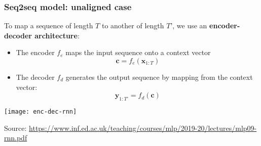 \documentclass[smaller]{beamer}
\begin{document}
\begin{frame}
  \frametitle{Seq2seq model: unaligned case}
  \pe
  \begin{minipage}{.5\linewidth}
  To map a sequence of length $T$ to another of length $T’$, we use an \textbf{encoder-decoder architecture}:\pe
  \begin{itemize}
  \item The encoder $f_e$ maps the input sequence onto a context vector
    \begin{equation}
      \bm c = f_e(\bm x_{1:T})
    \end{equation}
    \pe
  \item The decoder $f_d$ generates the output sequence by mapping from the context vector:\pe
    \begin{equation}
      \bm y_{1:T’} = f_d(\bm c)
    \end{equation}
  \end{itemize}
\end{minipage}\pe
\begin{minipage}{.45\linewidth}
  \begin{center}
    \texttt{[image: enc-dec-rnn]}

    {\tiny Source: \url{https://www.inf.ed.ac.uk/teaching/courses/mlp/2019-20/lectures/mlp09-rnn.pdf}}
  \end{center}
\end{minipage}

\end{frame}
\end{document}
